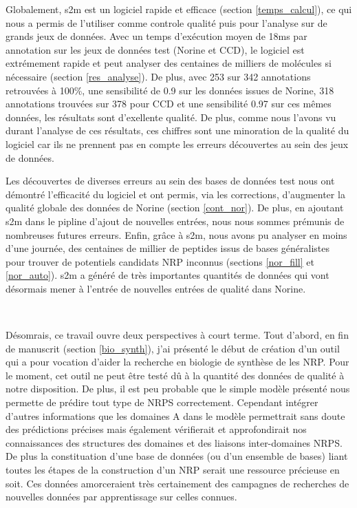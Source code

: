 Globalement, s2m est un logiciel rapide et efficace (section \ref{temps_calcul}), ce qui nous a permis de l'utiliser comme controle qualité puis pour l'analyse sur de grands jeux de données.
Avec un temps d'exécution moyen de 18ms par annotation sur les jeux de données test (Norine et CCD), le logiciel est extrémement rapide et peut analyser des centaines de milliers de molécules si nécessaire (section \ref{res_analyse}).
De plus, avec 253 sur 342 annotations retrouvées à 100\%, une sensibilité de 0.9 sur les données issues de Norine, 318 annotations trouvées sur 378 pour CCD et une sensibilité 0.97 sur ces mêmes données, les résultats sont d'exellente qualité.
De plus, comme nous l'avons vu durant l'analyse de ces résultats, ces chiffres sont une minoration de la qualité du logiciel car ils ne prennent pas en compte les erreurs découvertes au sein des jeux de données.

Les découvertes de diverses erreurs au sein des bases de données test nous ont démontré l'efficacité du logiciel et ont permis, via les corrections, d'augmenter la qualité globale des données de Norine (section \ref{cont_nor}).
De plus, en ajoutant s2m dans le pipline d'ajout de nouvelles entrées, nous nous sommes prémunis de nombreuses futures erreurs.
Enfin, grâce à s2m, nous avons pu analyser en moins d'une journée, des centaines de millier de peptides issus de bases généralistes pour trouver de potentiels candidats NRP inconnus (sections \ref{nor_fill} et \ref{nor_auto}).
s2m a généré de très importantes quantités de données qui vont désormais mener à l'entrée de nouvelles entrées de qualité dans Norine.


~~


Désomrais, ce travail ouvre deux perspectives à court terme.
Tout d'abord, en fin de manuscrit (section \ref{bio_synth}), j'ai présenté le début de création d'un outil qui a pour vocation d'aider la recherche en biologie de synthèse de les NRP.
Pour le moment, cet outil ne peut être testé dû à la quantité des données de qualité à notre disposition.
De plus, il est peu probable que le simple modèle présenté nous permette de prédire tout type de NRPS correctement.
Cependant intégrer d'autres informations que les domaines A dans le modèle permettrait sans doute des prédictions précises mais également vérifierait et approfondirait nos connaissances des structures des domaines et des liaisons inter-domaines NRPS.
De plus la constituation d'une base de données (ou d'un ensemble de bases) liant toutes les étapes de la construction d'un NRP serait une ressource précieuse en soit.
Ces données amorceraient très certainement des campagnes de recherches de nouvelles données par apprentissage sur celles connues.


